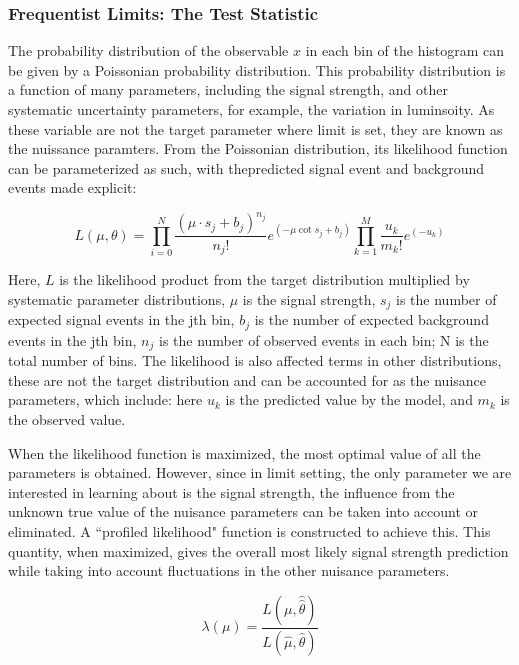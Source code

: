 \subsubsection{Frequentist Limits: The Test Statistic}
\label{sec:freqTestStats}

The probability distribution of the observable $x$ in each bin of the histogram can be given by a Poissonian probability distribution. This probability distribution is a function of many parameters, including the signal strength, and other systematic uncertainty parameters, for example, the variation in luminsoity. As these variable are not the target parameter where limit is set, they are known as the nuissance paramters. From the Poissonian distribution, its likelihood function can be parameterized as such, with thepredicted signal event and background events made explicit:

\begin{equation}
    L(\mu, \theta) =  \prod_{i=0}^{N} \frac{(\mu \cdot s_{j} + b_{j})^{n_j}}{n_{j}!}e^{(-\mu \cot s_j + b_j)} \prod_{k=1}^{M}\frac{u_{k}}
{m_{k}!} e^{(-u_{k})}
\label{eq:likelihood}
\end{equation}

Here, $L$ is the likelihood product from the target distribution multiplied by systematic parameter distributions, $\mu$ is the signal strength, $s_j$ is the number of expected signal events in the jth bin, $b_j$ is the number of expected background events in the jth  bin, $n_j$ is the number of observed events in each bin; N is the total number of bins. The likelihood is also affected terms in other distributions, these
are not the target distribution and can be accounted for as the nuisance parameters, which
include: here $u_k$ is the predicted value by the model, and $m_{k}$ is the observed value. 

When the likelihood function is maximized, the most optimal value of all the parameters is obtained. However, since in limit setting, the only parameter we are interested in learning about is the signal strength, the influence from the unknown true value of the nuisance parameters can be taken into account or eliminated. A ``profiled likelihood" function is constructed to achieve this. This quantity, when maximized, gives the overall most likely signal strength prediction while taking into account fluctuations in the other nuisance parameters. 

\begin{equation}
\lambda(\mu) = \frac{L(\mu, \hat{\hat{\theta}})}{L(\hat{\mu}, \hat{\theta})}
\label{eq:profilelikelihood}
\end{equation}

